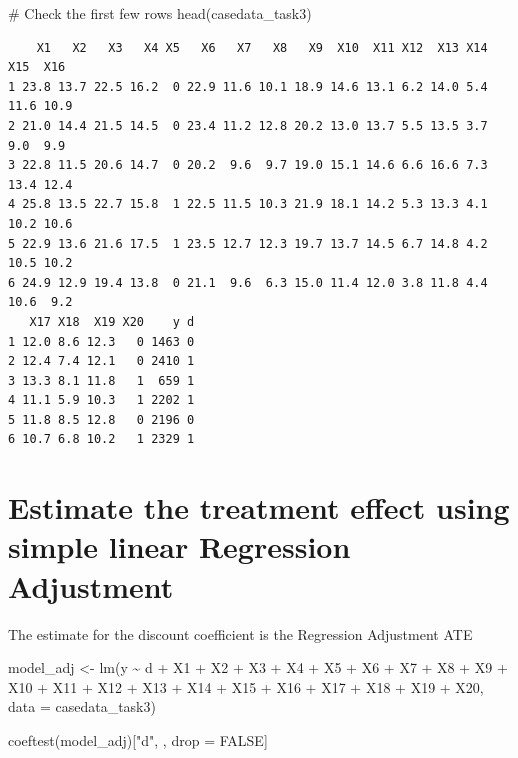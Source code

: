 \documentclass[
  letterpaper,
  DIV=11,
  numbers=noendperiod]{scrartcl}
\newenvironment{Shaded}{\begin{snugshade}}{\end{snugshade}}
\newcommand{\AttributeTok}[1]{\textcolor[rgb]{0.40,0.45,0.13}{#1}}
\newcommand{\CommentTok}[1]{\textcolor[rgb]{0.37,0.37,0.37}{#1}}
\newcommand{\ConstantTok}[1]{\textcolor[rgb]{0.56,0.35,0.01}{#1}}
\newcommand{\FunctionTok}[1]{\textcolor[rgb]{0.28,0.35,0.67}{#1}}
\newcommand{\NormalTok}[1]{\textcolor[rgb]{0.00,0.23,0.31}{#1}}
\newcommand{\OtherTok}[1]{\textcolor[rgb]{0.00,0.23,0.31}{#1}}
\newcommand{\SpecialCharTok}[1]{\textcolor[rgb]{0.37,0.37,0.37}{#1}}
\newcommand{\StringTok}[1]{\textcolor[rgb]{0.13,0.47,0.30}{#1}}
\begin{document}
\begin{Shaded}
\begin{Highlighting}[]
\CommentTok{\# Check the first few rows}
\FunctionTok{head}\NormalTok{(casedata\_task3)}
\end{Highlighting}
\end{Shaded}

\begin{verbatim}
    X1   X2   X3   X4 X5   X6   X7   X8   X9  X10  X11 X12  X13 X14  X15  X16
1 23.8 13.7 22.5 16.2  0 22.9 11.6 10.1 18.9 14.6 13.1 6.2 14.0 5.4 11.6 10.9
2 21.0 14.4 21.5 14.5  0 23.4 11.2 12.8 20.2 13.0 13.7 5.5 13.5 3.7  9.0  9.9
3 22.8 11.5 20.6 14.7  0 20.2  9.6  9.7 19.0 15.1 14.6 6.6 16.6 7.3 13.4 12.4
4 25.8 13.5 22.7 15.8  1 22.5 11.5 10.3 21.9 18.1 14.2 5.3 13.3 4.1 10.2 10.6
5 22.9 13.6 21.6 17.5  1 23.5 12.7 12.3 19.7 13.7 14.5 6.7 14.8 4.2 10.5 10.2
6 24.9 12.9 19.4 13.8  0 21.1  9.6  6.3 15.0 11.4 12.0 3.8 11.8 4.4 10.6  9.2
   X17 X18  X19 X20    y d
1 12.0 8.6 12.3   0 1463 0
2 12.4 7.4 12.1   0 2410 1
3 13.3 8.1 11.8   1  659 1
4 11.1 5.9 10.3   1 2202 1
5 11.8 8.5 12.8   0 2196 0
6 10.7 6.8 10.2   1 2329 1
\end{verbatim}

\section{Estimate the treatment effect using simple linear Regression
Adjustment}\label{estimate-the-treatment-effect-using-simple-linear-regression-adjustment}

The estimate for the discount coefficient is the Regression Adjustment
ATE

\begin{Shaded}
\begin{Highlighting}[]
\NormalTok{model\_adj }\OtherTok{\textless{}{-}} \FunctionTok{lm}\NormalTok{(y }\SpecialCharTok{\textasciitilde{}}\NormalTok{ d }\SpecialCharTok{+}\NormalTok{ X1 }\SpecialCharTok{+}\NormalTok{ X2 }\SpecialCharTok{+}\NormalTok{ X3 }\SpecialCharTok{+}\NormalTok{ X4 }\SpecialCharTok{+}\NormalTok{ X5 }\SpecialCharTok{+}\NormalTok{ X6 }\SpecialCharTok{+}\NormalTok{ X7 }\SpecialCharTok{+}\NormalTok{ X8 }\SpecialCharTok{+}\NormalTok{ X9 }\SpecialCharTok{+}\NormalTok{ X10 }\SpecialCharTok{+}
\NormalTok{                 X11 }\SpecialCharTok{+}\NormalTok{ X12 }\SpecialCharTok{+}\NormalTok{ X13 }\SpecialCharTok{+}\NormalTok{ X14 }\SpecialCharTok{+}\NormalTok{ X15 }\SpecialCharTok{+}\NormalTok{ X16 }\SpecialCharTok{+}\NormalTok{ X17 }\SpecialCharTok{+}\NormalTok{ X18 }\SpecialCharTok{+}\NormalTok{ X19 }\SpecialCharTok{+}\NormalTok{ X20,}
                 \AttributeTok{data =}\NormalTok{ casedata\_task3)}

\FunctionTok{coeftest}\NormalTok{(model\_adj)[}\StringTok{"d"}\NormalTok{, , drop }\OtherTok{=} \ConstantTok{FALSE}\NormalTok{]}
\end{Highlighting}
\end{Shaded}
\end{document}

